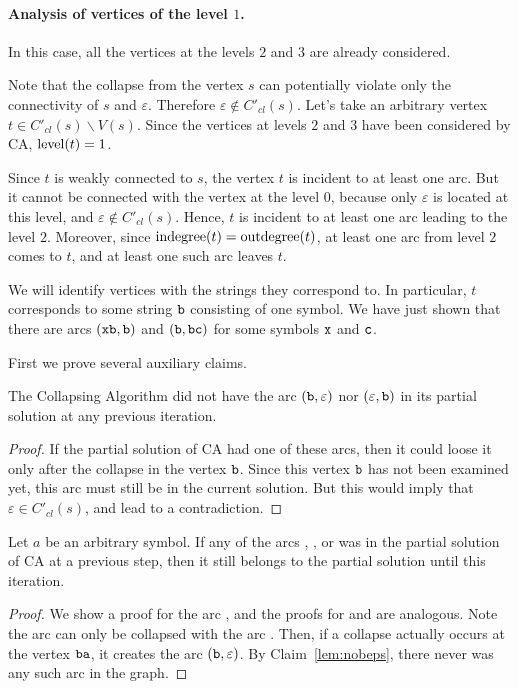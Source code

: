 \paragraph{Analysis of vertices of the level \texorpdfstring{$1$}{1}.}

In this case, all the vertices at the levels $ 2 $ and $ 3 $ are already considered.

Note that the collapse from the vertex $ s $ can potentially violate only the connectivity of $ s $ and $ \varepsilon $. Therefore $ \varepsilon \notin C'_{cl} (s) $. Let's take an arbitrary vertex $ t \in C'_{cl}(s) \backslash V(s)$. Since the vertices at levels $2$ and $3$ have been considered by CA, $ \operatorname{level} (t) = 1 $.

Since $t$ is weakly connected to $s$, the vertex $ t $ is incident to at least one arc. But it cannot be connected with the vertex at the level $ 0 $, because only $ \varepsilon $ is located at this level, and $ \varepsilon \notin C'_{cl} (s) $. Hence, $ t $ is incident to at least one arc leading to the level $ 2 $. Moreover, since $ \operatorname{indegree}(t)=\operatorname{outdegree}(t)$, at least one arc from level $2$ comes to $ t $, and at least one such arc leaves $ t $.

We will identify vertices with the strings they correspond to. In particular, $ t $ corresponds to some string $ \tt b $ consisting of one symbol. We have just shown that there are arcs $ ({\tt xb}, {\tt b}) $ and $ ({\tt b}, {\tt bc}) $ for some symbols $ {\tt x} $ and $ {\tt c} $.

First we prove several auxiliary claims.

\begin{claim}
\label{lem:nobeps}
The Collapsing Algorithm did not have the arc $ ({\tt b}, \varepsilon) $ nor $ (\varepsilon, {\tt b}) $ in its partial solution at any previous iteration.
\end{claim}
\begin{proof}
If the partial solution of CA had one of these arcs, then it could loose it only after the collapse in the vertex $ {\tt b} $. Since this vertex $ {\tt b} $ has not been examined yet, this arc must still be in the current solution. But this would imply that $ \varepsilon \in C'_{cl} (s) $, and lead to a contradiction.
\end{proof}

\begin{claim}
\label{lem:bccsave}
Let $a$ be an arbitrary symbol. If any of the arcs , , or  was in the partial solution of CA at a previous step, then it still belongs to the partial solution until this iteration.
\end{claim}
\begin{proof}
We show a proof for the arc , and the proofs for  and  are analogous.  Note the arc  can only be collapsed with the arc . Then, if a collapse actually occurs at the vertex $ {\tt ba} $, it creates the arc $ ({\tt b}, \varepsilon) $. By Claim~\ref{lem:nobeps}, there never was any such arc in the graph. \end{proof}

